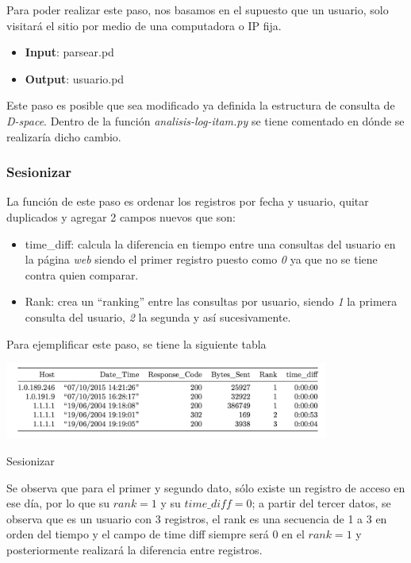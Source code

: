 Para poder realizar este paso, nos basamos en el supuesto que un usuario, solo visitará el sitio por medio de una computadora o IP fija.

\begin{itemize}
\item \textbf{Input}: parsear.pd
\item \textbf{Output}: usuario.pd
\end{itemize}


Este paso es posible que sea modificado ya definida la estructura de
consulta de \emph{D-space}. Dentro de la función
\emph{analisis-log-itam.py} se tiene comentado en dónde se realizaría
dicho cambio.

\subsubsection{ Sesionizar}\label{iv-sesionizar}

La función de este paso es ordenar los registros por fecha y usuario,
quitar duplicados y agregar 2 campos nuevos que son:

\begin{itemize}
\item
  time\_diff: calcula la diferencia en tiempo entre una consultas del
  usuario en la página \emph{web} siendo el primer registro puesto como
  \emph{0} ya que no se tiene contra quien comparar.
\item
  Rank: crea un ``ranking'' entre las consultas por usuario, siendo
  \emph{1} la primera consulta del usuario, \emph{2} la segunda y así
  sucesivamente.
\end{itemize}

Para ejemplificar este paso, se tiene la siguiente tabla

\begin{table}[H]
\centering
\includegraphics[width=0.8\textwidth]{Figures/tabla1.png}
\caption{Sesionizar}
\end{table}

Se observa que para el primer y segundo dato, sólo existe un registro de acceso en ese día, por lo que su $rank=1$ y su $time\_diff=0$; a partir del tercer datos, se observa que es un usuario con 3 registros, el rank es una secuencia de 1 a 3 en orden del tiempo y el campo de time diff siempre será 0 en el $rank=1$ y posteriormente realizará la diferencia entre registros.

